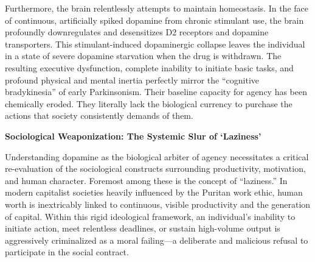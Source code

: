 Furthermore, the brain relentlessly attempts to maintain homeostasis. In the face of continuous, artificially spiked dopamine from chronic stimulant use, the brain profoundly downregulates and desensitizes D2 receptors and dopamine transporters. This stimulant-induced dopaminergic collapse leaves the individual in a state of severe dopamine starvation when the drug is withdrawn. The resulting executive dysfunction, complete inability to initiate basic tasks, and profound physical and mental inertia perfectly mirror the ``cognitive bradykinesia'' of early Parkinsonism. Their baseline capacity for agency has been chemically eroded. They literally lack the biological currency to purchase the actions that society consistently demands of them.

\textbf{Sociological Weaponization: The Systemic Slur of `Laziness'}

Understanding dopamine as the biological arbiter of agency necessitates a critical re-evaluation of the sociological constructs surrounding productivity, motivation, and human character. Foremost among these is the concept of ``laziness.'' In modern capitalist societies heavily influenced by the Puritan work ethic, human worth is inextricably linked to continuous, visible productivity and the generation of capital. Within this rigid ideological framework, an individual's inability to initiate action, meet relentless deadlines, or sustain high-volume output is aggressively criminalized as a moral failing---a deliberate and malicious refusal to participate in the social contract.

